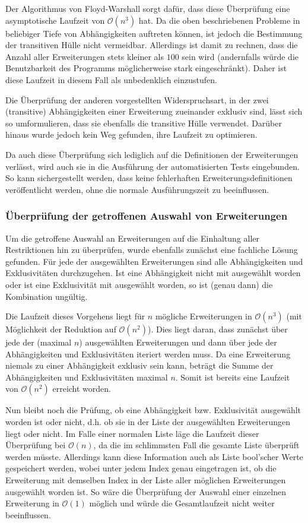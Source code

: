 Der Algorithmus von Floyd-Warshall sorgt dafür, dass diese Überprüfung eine asymptotische Laufzeit von $\mathcal{O}(n^3)$ hat. Da die oben beschriebenen Probleme in beliebiger Tiefe von Abhängigkeiten auftreten können, ist jedoch die Bestimmung der transitiven Hülle nicht vermeidbar. Allerdings ist damit zu rechnen, dass die Anzahl aller Erweiterungen stets kleiner als $100$ sein wird (andernfalls würde die Benutzbarkeit des Programms möglicherweise stark eingeschränkt). Daher ist diese Laufzeit in diesem Fall als unbedenklich einzustufen.

Die Überprüfung der anderen vorgestellten Widerspruchsart, in der zwei (transitive) Abhängigkeiten einer Erweiterung zueinander exklusiv sind, lässt sich so umformulieren, dass sie ebenfalls die transitive Hülle verwendet. Darüber hinaus wurde jedoch kein Weg gefunden, ihre Laufzeit zu optimieren.

Da auch diese Überprüfung sich lediglich auf die Definitionen der Erweiterungen verlässt, wird auch sie in die Ausführung der automatisierten Tests eingebunden. So kann sichergestellt werden, dass keine fehlerhaften Erweiterungsdefinitionen veröffentlicht werden, ohne die normale Ausführungszeit zu beeinflussen.

\subsubsection{Überprüfung der getroffenen Auswahl von Erweiterungen}
\label{impl:verify_chosen_extensions}
Um die getroffene Auswahl an Erweiterungen auf die Einhaltung aller Restriktionen hin zu überprüfen, wurde ebenfalls zunächst eine fachliche Lösung gefunden. Für jede der ausgewählten Erweiterungen sind alle Abhängigkeiten und Exklusivitäten durchzugehen. Ist eine Abhängigkeit nicht mit ausgewählt worden oder ist eine Exklusivität mit ausgewählt worden, so ist (genau dann) die Kombination ungültig.

Die Laufzeit dieses Vorgehens liegt für $n$ mögliche Erweiterungen in $\mathcal{O}(n^3)$ (mit Möglichkeit der Reduktion auf $\mathcal{O}(n^2)$). Dies liegt daran, dass zunächst über jede der (maximal $n$) ausgewählten Erweiterungen und dann über jede der Abhängigkeiten und Exklusivitäten iteriert werden muss. Da eine Erweiterung niemals zu einer Abhängigkeit exklusiv sein kann, beträgt die Summe der Abhängigkeiten und Exklusivitäten maximal $n$. Somit ist bereits eine Laufzeit von $\mathcal{O}(n^2)$ erreicht worden.

Nun bleibt noch die Prüfung, ob eine Abhängigkeit bzw. Exklusivität ausgewählt worden ist oder nicht, d.h. ob sie in der Liste der ausgewählten Erweiterungen liegt oder nicht. Im Falle einer normalen Liste läge die Laufzeit dieser Überprüfung bei $\mathcal{O}(n)$, da die im schlimmsten Fall die gesamte Liste überprüft werden müsste. Allerdings kann diese Information auch als Liste bool'scher Werte gespeichert werden, wobei unter jedem Index genau eingetragen ist, ob die Erweiterung mit demselben Index in der Liste aller möglichen Erweiterungen ausgewählt worden ist. So wäre die Überprüfung der Auswahl einer einzelnen Erweiterung in $\mathcal{O}(1)$ möglich und würde die Gesamtlaufzeit nicht weiter beeinflussen.

